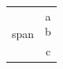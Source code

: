 \begin{table}[htbp]\centering
\begin{tabular}{cc}
\multirow{2}{*}{span} & \makecell{a\\b} \\
& c \\
\end{tabular}
\end{table}
